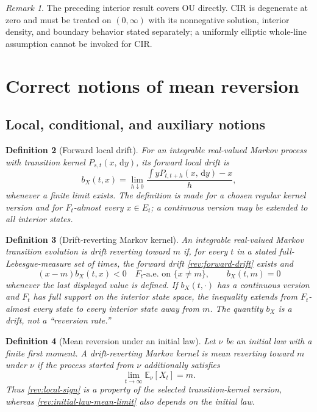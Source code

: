 \documentclass[11pt]{article}
\newtheorem{definition}{Definition}[section]
\theoremstyle{remark}
\newtheorem{remark}[definition]{Remark}
\newcommand{\E}{\mathbb E}
\newcommand{\dd}{\,\mathrm d}
\begin{document}
\begin{remark}
The preceding interior result covers OU directly.  CIR is degenerate at zero
and must be treated on $(0,\infty)$ with its nonnegative solution, interior
density, and boundary behavior stated separately; a uniformly elliptic
whole-line assumption cannot be invoked for CIR.
\end{remark}

\section{Correct notions of mean reversion}

\subsection{Local, conditional, and auxiliary notions}

\begin{definition}[Forward local drift]
\label{rev:def-forward-drift}
For an integrable real-valued Markov process with transition kernel
$P_{s,t}(x,\dd y)$, its forward local drift is
\begin{equation}
b_X(t,x)=\lim_{h\downarrow0}
\frac{\int yP_{t,t+h}(x,\dd y)-x}{h},
\label{rev:forward-drift}
\end{equation}
whenever a finite limit exists.  The definition is made for a chosen regular
kernel version and for $F_t$-almost every $x\in E_t$; a continuous version may
be extended to all interior states.
\end{definition}

\begin{definition}[Drift-reverting Markov kernel]
\label{rev:def-local-mr}
An integrable real-valued Markov transition evolution is \emph{drift
reverting toward $m$} if, for every $t$ in a stated full-Lebesgue-measure set
of times, the forward drift \eqref{rev:forward-drift} exists and
\begin{equation}
(x-m)b_X(t,x)<0
\quad F_t\text{-a.e. on }\{x\ne m\},
\qquad b_X(t,m)=0
\label{rev:local-sign}
\end{equation}
whenever the last displayed value is defined.  If $b_X(t,\cdot)$ has a
continuous version and $F_t$ has full support on the interior state space, the
inequality extends from $F_t$-almost every state to every interior state away
from $m$.  The quantity $b_X$ is a drift, not a ``reversion rate.''
\end{definition}

\begin{definition}[Mean reversion under an initial law]
\label{rev:def-initial-law-mr}
Let $\nu$ be an initial law with a finite first moment.  A drift-reverting
Markov kernel is \emph{mean reverting toward $m$ under $\nu$} if the process
started from $\nu$ additionally satisfies
\begin{equation}
 \lim_{t\to\infty}\E_\nu[X_t]=m.
 \label{rev:initial-law-mean-limit}
\end{equation}
Thus \eqref{rev:local-sign} is a property of the selected transition-kernel
version, whereas \eqref{rev:initial-law-mean-limit} also depends on the
initial law.
\end{definition}
\end{document}
